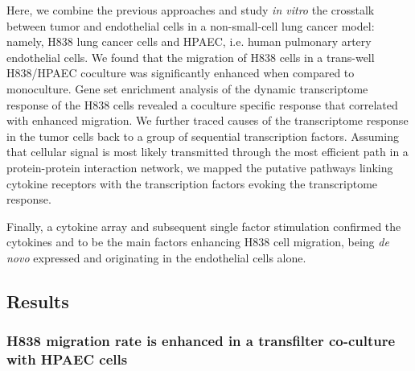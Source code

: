 Here, we combine the previous approaches and
study \emph{in vitro} the crosstalk between tumor and 
endothelial cells in  a non-small-cell lung cancer model: namely,
H838 lung cancer cells and HPAEC, i.e. human pulmonary artery endothelial cells.
We found that the  migration of  H838 cells in a trans-well H838/HPAEC coculture
was significantly enhanced when compared to monoculture.
Gene set enrichment analysis of the dynamic transcriptome
response of the H838 cells  revealed a coculture specific response 
that correlated with enhanced migration.
We further 
traced causes of the transcriptome response in the tumor cells back to 
a group of sequential transcription factors.
Assuming that cellular signal is most likely transmitted through the most efficient 
path in a protein-protein interaction network, we 
mapped the putative pathways linking cytokine receptors with the 
transcription factors evoking the transcriptome response. 

Finally, a cytokine array and subsequent single factor stimulation
confirmed the cytokines \tnfa and \sdfonea
to be the main factors enhancing H838 cell migration,
being \emph{de novo} expressed and originating in the endothelial cells alone. 




\subsection{Results}

\subsubsection{H838 migration rate is enhanced in a transfilter co-culture with HPAEC cells}

